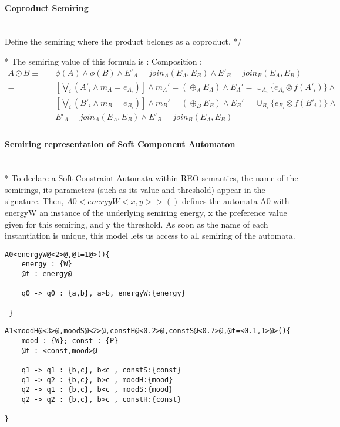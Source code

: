 \documentclass{article}
\theoremstyle{plain}
\theoremstyle{definition}
\begin{document}
\paragraph{ Coproduct Semiring} \hspace{0pt} \\
Define the semiring where the product belongs as a coproduct.
*/




\/*
The semiring value of this formula is :
Composition :
\begin{align*}
A \odot B \equiv & \quad \phi(A) \land \phi(B) \land E'_A=join_A(E_A,E_B) \land E'_B = join_B(E_A,E_B) \\
		=  & \quad [\bigvee_i(A'_i \land m_{A}=e_{A_i})] \land m_A'= (\oplus_A E_A) \land E_A'= \cup_{A_i} \{ e_{A_i} \otimes f(A'_i)\}  \land \\
		& \quad  [\bigvee_i(B'_i \land m_{B}=e_{B_i})] \land m_B'= (\oplus_B E_B) \land E_B'= \cup_{B_i} \{ e_{B_i} \otimes f(B'_i)\} \land  \\
		& \quad E'_A=join_A(E_A,E_B) \land E'_B = join_B(E_A,E_B) \\
\end{align*}

\paragraph{Semiring representation of Soft Component Automaton} \hspace{0pt} \\


\/*
\noindent
To declare a Soft Constraint Automata within REO semantics, the name of the semirings, its parameters (such as its value and threshold) appear in the signature. Then, $A0<energyW<x,y>>(){}$ defines the automata A0 with energyW an instance of the underlying semiring energy, x the preference value given for this semiring, and y the threshold. As soon as the name of each instantiation is unique, this model lets us access to all semiring of the automata.
\begin{lstlisting}[frame=single,style=base] 
A0<energyW@<2>@,@t=1@>(){
    energy : {W}
    @t : energy@

    q0 -> q0 : {a,b}, a>b, energyW:{energy} 

 }
\end{lstlisting}
\begin{lstlisting}[frame=single,style=base] 
A1<moodH@<3>@,moodS@<2>@,constH@<0.2>@,constS@<0.7>@,@t=<0.1,1>@>(){
    mood : {W}; const : {P}
    @t : <const,mood>@

    q1 -> q1 : {b,c}, b<c , constS:{const}
    q1 -> q2 : {b,c}, b>c , moodH:{mood}
    q2 -> q1 : {b,c}, b<c , moodS:{mood}
    q2 -> q2 : {b,c}, b>c , constH:{const}

}
\end{lstlisting}
\end{document}
